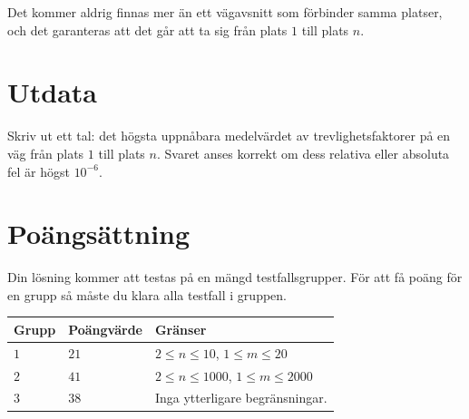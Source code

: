 Det kommer aldrig finnas mer än ett vägavsnitt som förbinder samma platser, och det garanteras
att det går att ta sig från plats $1$ till plats $n$.

\section*{Utdata}
Skriv ut ett tal: det högsta uppnåbara medelvärdet av trevlighetsfaktorer på en väg från plats $1$ till plats $n$.
Svaret anses korrekt om dess relativa eller absoluta fel är högst $10^{-6}$.

\section*{Poängsättning}
Din lösning kommer att testas på en mängd testfallsgrupper. För att få poäng för en grupp så måste du klara alla testfall i gruppen.

\noindent
\begin{tabular}{| l | l | l |}
\hline
Grupp & Poängvärde & Gränser \\ \hline
$1$     & $21$         &  $2 \le n \le 10$, $1 \le m \le 20$ \\ \hline
$2$     & $41$         &  $2 \le n \le 1000$, $1 \le m \le 2000$ \\ \hline
$3$     & $38$         & Inga ytterligare begränsningar. \\ \hline
\end{tabular}
